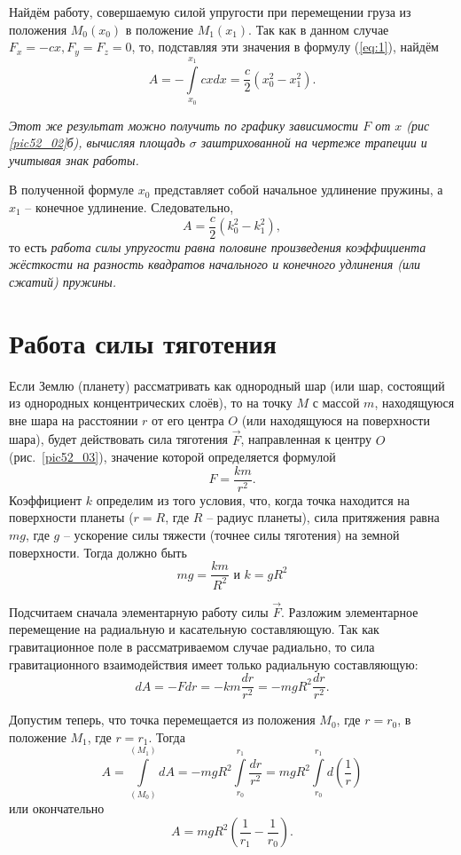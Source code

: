 Найдём работу, совершаемую силой упругости при перемещении груза из 
положения \( M_0(x_0) \) в положение \( M_1(x_1) \). Так как в данном 
случае \( F_x = -cx, F_y = F_z = 0 \), то, подставляя эти значения в 
формулу (\ref{eq:1}), найдём
\[ 
    A = - \int\limits_{x_0}^{x_1} cxdx = 
    \frac{c}{2} \left( x^{2}_0 - x^{2}_1 \right).
\]

\emph{Этот же результат можно получить по графику зависимости 
\( F \) от \( x \) (рис \ref{pic52_02}б), вычисляя площадь \( \sigma \) 
заштрихованной на чертеже трапеции и учитывая знак работы.}

В полученной формуле \( x_0 \) представляет собой начальное удлинение 
пружины, а \( x_1 \) -- конечное удлинение. 
Следовательно, 
\[
    A = \frac{c}{2} \left( k^{2}_0 - k^{2}_1 \right),
\]
то есть \emph{работа силы упругости равна половине произведения 
коэффициента жёсткости на разность квадратов начального и конечного 
удлинения (или сжатий) пружины.}

\section{Работа силы тяготения}
Если Землю (планету) рассматривать как однородный шар (или шар, 
состоящий из однородных концентрических слоёв), то на точку \( M \) с 
массой \( m \), находящуюся вне шара на расстоянии \( r \) от его 
центра \( O \) (или находящуюся на поверхности шара), будет действовать 
сила тяготения \( \vec{F} \), направленная к центру \( O \)
(рис.~\ref{pic52_03}), значение которой определяется формулой 
\[
    F = \frac{km}{r^2}.
\]
Коэффициент \( k \) определим из того условия, что, когда точка 
находится на поверхности планеты (\( r = R \), где \( R \) -- радиус планеты), 
сила притяжения равна \( mg \), где \( g \) -- ускорение силы тяжести 
(точнее силы тяготения) на земной поверхности. Тогда должно быть
\[ mg = \frac{km}{R^2} \text{ и } k = gR^2 \]

Подсчитаем сначала элементарную работу силы \( \vec{F} \). Разложим элементарное
перемещение на радиальную и касательную составляющую. Так как гравитационное
поле в рассматриваемом случае радиально, то сила гравитационного взаимодействия
имеет только радиальную составляющую:
\[
    dA = -Fdr = -km\frac{dr}{r^2} = -mgR^2 \frac{dr}{r^2}.
\]

Допустим теперь, что точка перемещается из положения \( M_0 \), где 
\( r = r_0 \), в положение \( M_1 \), где \( r = r_1 \). Тогда 
\[ 
    A = \int\limits_{(M_0)}^{(M_1)} dA = 
    -mgR^2 \int\limits_{r_0}^{r_1} \frac{dr}{r^2} =
    mgR^2 \int\limits_{r_0}^{r_1} d\left( \frac{1}{r} \right)
\]
или окончательно
\[
    A = mgR^2 \left( \frac{1}{r_1} - \frac{1}{r_0} \right).
\]

\newpage
